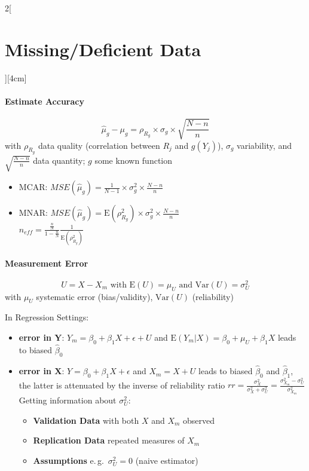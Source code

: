 \documentclass[8pt]{extarticle}
\begin{document}
\begin{multicols}{2}[\section{Missing/Deficient Data}][4cm]
 \paragraph{Estimate Accuracy}
 
 $$\hat{\mu}_g - \mu_g =\rho_{R_g} \times \sigma_g \times \sqrt{\frac{N-n}{n}}$$
 with $\rho_{R_g}$  data quality (correlation between $R_j$ and $g(Y_j)$), $\sigma_g$ variability, and $\sqrt{\frac{N-n}{n}}$ data quantity; $g$ some known function

\begin{itemize}
\item MCAR: $MSE(\hat{\mu}_g) = \frac{1}{N-1} \times \sigma^2_g \times \frac{N-n}{n}$
\item MNAR: $MSE(\hat{\mu}_g) = \mathrm{E}(\rho^2_{R_g}) \times \sigma^2_g \times \frac{N-n}{n}$ \\
$n_{eff} = \frac{\frac{n}{N}}{1-\frac{n}{N}}\frac{1}{\mathrm{E}(\rho^2_{R_g})}$
\end{itemize}

\paragraph{Measurement Error}

$$U = X - X_m \text{ with } \mathrm{E}(U) = \mu_U \text{ and }  \mathrm{Var}(U) = \sigma_U^2$$
with $\mu_U$ systematic error (bias/validity), $\mathrm{Var}(U)$ (reliability)

\noindent In Regression Settings:

\begin{itemize}
\item \textbf{error in $\mathbf{Y}$}: $Y_m = \beta_0 + \beta_1X +\epsilon+U$ and $\mathrm{E}(Y_m|X) = \beta_0 + \mu_U + \beta_1X$ leads to  biased $\hat{\beta}_0$
\item \textbf{ error in $\mathbf{X}$}: $Y=\beta_0 + \beta_1X +\epsilon$ and $X_m = X + U$ leads to biased $\hat{\beta}_0$ and $\hat{\beta}_1$, the latter is attenuated by the inverse of reliability ratio $rr = \frac{\sigma^2_X}{\sigma^2_X +\sigma^2_U} = \frac{\sigma^2_{X_m} {-}\sigma^2_U}{\sigma^2_{X_m}}$ \\
Getting information about $\sigma_U^2$:
\begin{itemize}
\item \textbf{Validation Data} with both $X$ and $X_m$ observed 
\item \textbf{Replication Data} repeated measures of $X_m$
\item \textbf{Assumptions} e.\,g.\ $\sigma_U^2=0$ (naive estimator)
\end{itemize}
\end{itemize}

\end{multicols}
\end{document}
